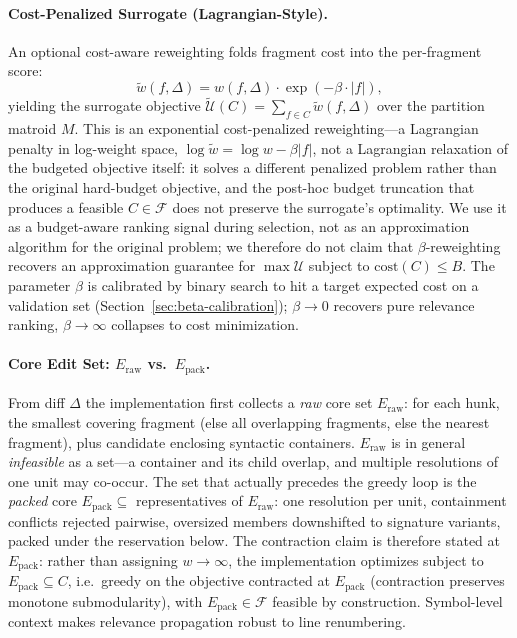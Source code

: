 \documentclass[11pt, a4paper]{article}
\begin{document}
\paragraph{Cost-Penalized Surrogate (Lagrangian-Style).} An optional cost-aware reweighting folds fragment cost into the per-fragment score:
\begin{equation}
\tilde{w}(f, \Delta) = w(f, \Delta) \cdot \exp(-\beta \cdot |f|),
\label{eq:boltzmann}
\end{equation}
yielding the surrogate objective $\tilde{\mathcal{U}}(C) = \sum_{f \in C} \tilde{w}(f, \Delta)$ over the partition matroid $M$. This is an exponential cost-penalized reweighting---a Lagrangian penalty in log-weight space, $\log \tilde{w} = \log w - \beta |f|$, not a Lagrangian relaxation of the budgeted objective itself: it solves a different penalized problem rather than the original hard-budget objective, and the post-hoc budget truncation that produces a feasible $C \in \mathcal{F}$ does not preserve the surrogate's optimality. We use it as a budget-aware ranking signal during selection, not as an approximation algorithm for the original problem; we therefore do not claim that $\beta$-reweighting recovers an approximation guarantee for $\max \mathcal{U}$ subject to $\mathrm{cost}(C) \leq B$. The parameter $\beta$ is calibrated by binary search to hit a target expected cost on a validation set (Section~\ref{sec:beta-calibration}); $\beta \to 0$ recovers pure relevance ranking, $\beta \to \infty$ collapses to cost minimization.

\paragraph{Core Edit Set: $E_{\mathrm{raw}}$ vs.\ $E_{\mathrm{pack}}$.} From diff $\Delta$ the implementation first collects a \emph{raw} core set $E_{\mathrm{raw}}$: for each hunk, the smallest covering fragment (else all overlapping fragments, else the nearest fragment), plus candidate enclosing syntactic containers. $E_{\mathrm{raw}}$ is in general \emph{infeasible} as a set---a container and its child overlap, and multiple resolutions of one unit may co-occur. The set that actually precedes the greedy loop is the \emph{packed} core $E_{\mathrm{pack}} \subseteq$ representatives of $E_{\mathrm{raw}}$: one resolution per unit, containment conflicts rejected pairwise, oversized members downshifted to signature variants, packed under the reservation below. The contraction claim is therefore stated at $E_{\mathrm{pack}}$: rather than assigning $w \to \infty$, the implementation optimizes subject to $E_{\mathrm{pack}} \subseteq C$, i.e.\ greedy on the objective contracted at $E_{\mathrm{pack}}$ (contraction preserves monotone submodularity), with $E_{\mathrm{pack}} \in \mathcal{F}$ feasible by construction. Symbol-level context makes relevance propagation robust to line renumbering.
\end{document}
